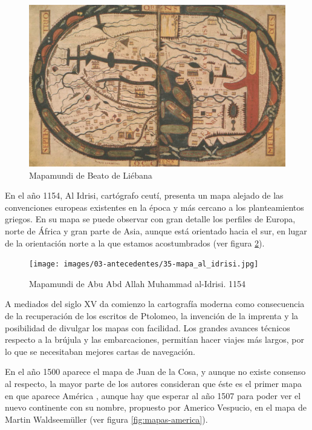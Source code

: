 \begin{figure}[h!btp]
\centering
\includegraphics[width=160mm, fbox={\fboxrule} 0mm]{images/03-antecedentes/34-mapa_beato_liebana.jpg}
\caption{Mapamundi de Beato de Liébana}
\label{fig:mapa-beato-liebana}
\end{figure}

En el año 1154, Al Idrisi, cartógrafo ceutí, presenta un mapa alejado de las convenciones europeas existentes en la época y más cercano a los planteamientos griegos. En su mapa se puede observar con gran detalle los perfiles de Europa, norte de África y gran parte de Asia, aunque está orientado hacia el sur, en lugar de la orientación norte a la que estamos acostumbrados (ver figura \ref{fig:mapa-al-idrisi}).

\begin{figure}[h!btp]
\centering
\texttt{[image: images/03-antecedentes/35-mapa\_al\_idrisi.jpg]}
\caption{Mapamundi de Abu Abd Allah Muhammad al-Idrisi. 1154}
\label{fig:mapa-al-idrisi}
\end{figure}

A mediados del siglo XV da comienzo la cartografía moderna como consecuencia de la recuperación de los escritos de Ptolomeo, la invención de la imprenta y la posibilidad de divulgar los mapas con facilidad. Los grandes avances técnicos respecto a la brújula y las embarcaciones, permitían hacer viajes más largos, por lo que se necesitaban mejores cartas de navegación.

En el año 1500 aparece el mapa de Juan de la Cosa, y aunque no existe consenso al respecto, la mayor parte de los autores consideran que éste es el primer mapa en que aparece América \cite{Verl06}, aunque hay que esperar al año 1507 para poder ver el nuevo continente con su nombre, propuesto por Americo Vespucio, en el mapa de Martin Waldseemüller (ver figura \ref{fig:mapas-america}).

